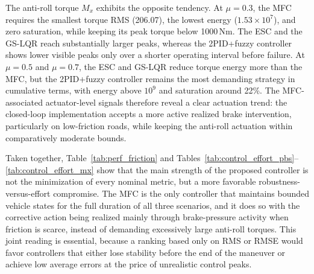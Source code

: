 \documentclass[sn-chicago,iicol]{sn-jnl}
\theoremstyle{thmstyleone}%
\theoremstyle{thmstyletwo}%
\theoremstyle{thmstylethree}%
\begin{document}
The anti-roll torque $M_x$ exhibits the opposite tendency. At $\mu = 0.3$, the MFC requires the smallest torque RMS (206.07), the lowest energy ($1.53\times10^7$), and zero saturation, while keeping its peak torque below 1000\,Nm. The ESC and the GS-LQR reach substantially larger peaks, whereas the 2PID+fuzzy controller shows lower visible peaks only over a shorter operating interval before failure. At $\mu = 0.5$ and $\mu = 0.7$, the ESC and GS-LQR reduce torque energy more than the MFC, but the 2PID+fuzzy controller remains the most demanding strategy in cumulative terms, with energy above $10^9$ and saturation around 22\%. The MFC-associated actuator-level signals therefore reveal a clear actuation trend: the closed-loop implementation accepts a more active realized brake intervention, particularly on low-friction roads, while keeping the anti-roll actuation within comparatively moderate bounds.

Taken together, Table~\ref{tab:perf_friction} and Tables~\ref{tab:control_effort_pbs}--\ref{tab:control_effort_mx} show that the main strength of the proposed controller is not the minimization of every nominal metric, but a more favorable robustness-versus-effort compromise. The MFC is the only controller that maintains bounded vehicle states for the full duration of all three scenarios, and it does so with the corrective action being realized mainly through brake-pressure activity when friction is scarce, instead of demanding excessively large anti-roll torques. This joint reading is essential, because a ranking based only on RMS or RMSE would favor controllers that either lose stability before the end of the maneuver or achieve low average errors at the price of unrealistic control peaks.
\end{document}
